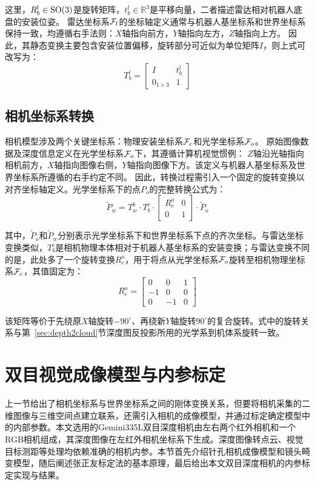 这里，$R_b^l \in {\rm{SO}}(3)$是旋转矩阵，$t_b^l \in {\mathbb{R}^3}$是平移向量，二者描述雷达相对机器人底盘的安装位姿。
雷达坐标系${\cal F}_l$的坐标轴定义通常与机器人基坐标系和世界坐标系保持一致，均遵循右手法则：$X$轴指向前方，$Y$轴指向左方，$Z$轴指向上方。
因此，其静态变换主要包含安装位置偏移，旋转部分可近似为单位矩阵$I$，则上式可改写为：
\begin{equation}
    T_b^l = \left[ {\begin{array}{*{20}{c}}
    I&{t_b^l}\\
    {{0_{1 \times 3}}}&1
    \end{array}} \right]
\end{equation}
\subsection{相机坐标系转换}
相机模型涉及两个关键坐标系：物理安装坐标系${\cal F}_c$和光学坐标系${\cal F}_o$。
原始图像数据及深度信息定义在光学坐标系${\cal F}_o$下，其遵循计算机视觉惯例：
$Z$轴沿光轴指向相机前方，$X$轴指向图像右侧，$Y$轴指向图像下方。该定义与机器人基坐标系及世界坐标系所遵循的右手约定不同。
因此，转换过程需引入一个固定的旋转变换以对齐坐标轴定义。光学坐标系下的点$P_o$的完整转换公式为：
\begin{equation}
    {\widetilde P_w} = T_w^b \cdot T_b^c \cdot \left[ {\begin{array}{*{20}{c}}
    {R_c^o}&0\\
    0&1
    \end{array}} \right] \cdot {\widetilde P_o}
\end{equation}

其中，${\tilde P_o}$和${\tilde P_w}$分别表示光学坐标系下和世界坐标系下点的齐次坐标。与雷达坐标变换类似，$T_b^c$是相机物理本体相对于机器人基坐标系的安装变换；与雷达变换不同的是，此处多了一个旋转变换${R_c^o}$，用于将点从光学坐标系${\cal F}_o$旋转至相机物理坐标系${\cal F}_c$，其值固定为：
\begin{equation}
    R_c^o = \left[ {\begin{array}{*{20}{c}}
    0&0&1\\
    { - 1}&0&0\\
    0&{ - 1}&0
    \end{array}} \right]
\end{equation}

该矩阵等价于先绕原$X$轴旋转$-90^\circ$、再绕新$Y$轴旋转$90^\circ$的复合旋转。式中的旋转关系与第~\ref{sec:depth2cloud}节深度图反投影所用的光学系到机体系旋转一致。

\section{双目视觉成像模型与内参标定}
上一节给出了相机坐标系与世界坐标系之间的刚体变换关系，但要将相机采集的二维图像与三维空间点建立联系，还需引入相机的成像模型，并通过标定确定模型中的内部参数。本文选用的Gemini335L双目深度相机由左右两个红外相机和一个RGB相机组成，其深度图像在左红外相机坐标系下生成。深度图像转点云、视觉目标测距等处理均依赖准确的相机内参。本节首先介绍针孔相机成像模型和镜头畸变模型，随后阐述张正友标定法的基本原理，最后给出本文双目深度相机的内参标定实现与结果。

